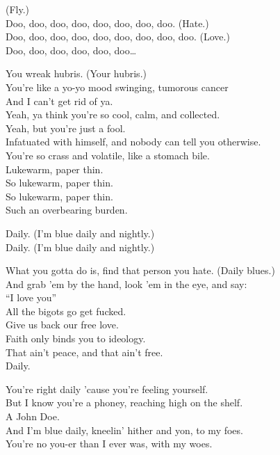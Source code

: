 (Fly.) \\
Doo, doo, doo, doo, doo, doo, doo, doo. (Hate.) \\
Doo, doo, doo, doo, doo, doo, doo, doo, doo. (Love.) \\
Doo, doo, doo, doo, doo, doo… \\


You wreak hubris. (Your hubris.) \\
You're like a yo-yo mood swinging, tumorous cancer \\
And I can't get rid of ya. \\
Yeah, ya think you're so cool, calm, and collected. \\
Yeah, but you're just a fool. \\
Infatuated with himself, and nobody can tell you otherwise. \\
You're so crass and volatile, like a stomach bile. \\
Lukewarm, paper thin. \\
So lukewarm, paper thin. \\
So lukewarm, paper thin. \\
Such an overbearing burden. \\


Daily. (I'm blue daily and nightly.) \\
Daily. (I'm blue daily and nightly.) \\


What you gotta do is, find that person you hate. (Daily blues.) \\
And grab 'em by the hand, look 'em in the eye, and say: \\
``I love you'' \\

All the bigots go get fucked. \\
Give us back our free love. \\
Faith only binds you to ideology. \\
That ain't peace, and that ain't free. \\
Daily. \\


You're right daily 'cause you're feeling yourself. \\
But I know you're a phoney, reaching high on the shelf. \\
A John Doe. \\
And I'm blue daily, kneelin' hither and yon, to my foes. \\
You're no you-er than I ever was, with my woes. \\

